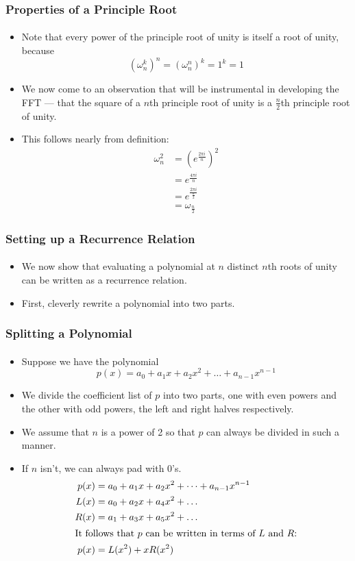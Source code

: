 \documentclass{beamer}                             %
\begin{document}
\begin{frame}
\frametitle{Properties of a Principle Root}
\framesubtitle{}
\begin{itemize}
  \item Note that every power of the principle root of unity is itself a root
    of unity, because \[ (\omega^k_n)^n = (\omega^n_n)^k = 1^k = 1 \] \pause
  \item We now come to an observation that will be instrumental in
    developing the FFT --- that the square of a \( n \)th principle root
    of unity is a \( \frac{n}{2} \)th principle root of unity.
  \item This follows nearly from definition:
    \begin{align*}
      \omega_n^2 &= (e^{\frac{2 \pi i}{n}})^2 \\
                &= e^{\frac{4 \pi i}{n}} \\
                &= e^{\frac{2 \pi i}{\frac{n}{2}}} \\
                &= \omega_{\frac{n}{2}}
    \end{align*}
\end{itemize}
\end{frame}

\begin{frame}
\frametitle{Setting up a Recurrence Relation}
\framesubtitle{}
\begin{itemize}
  \item We now show that evaluating a polynomial at \( n \) distinct \( n \)th
    roots of unity can be written as a recurrence relation.
  \item First, cleverly rewrite a polynomial into two parts.
\end{itemize}
\end{frame}

\begin{frame}
\frametitle{Splitting a Polynomial}
\framesubtitle{}
\begin{itemize}
  \item Suppose we have the polynomial
    \[ p(x) = a_0 + a_1 x + a_2 x^2 + \dots + a_{n - 1} x^{n - 1} \]
  \item We divide the coefficient list of \( p \) into
    two parts, one with even powers and the other with odd
    powers, the left and right halves respectively. \pause
  \item We assume that \( n \) is a power of 2 so that \( p \)
    can always be divided in such a manner. 
  \item If \( n \) isn't, we can always pad with 0's. \pause
    \begin{align}
      p(x) &= a_0 + a_1 x + a_2 x^2 + \dots + a_{n - 1} x^{n - 1} \\
      L(x) &= a_0 + a_2 x + a_4 x^2 + \dots \\
      R(x) &= a_1 + a_3 x + a_5 x^2 + \dots \\
      \shortintertext{It follows that \( p \) can be written
      in terms of \( L \) and \( R \):}
      p(x) &= L(x^2) + x R(x^2) \label{eq:recurrence} 
    \end{align}
\end{itemize}
\end{frame}
\end{document}
